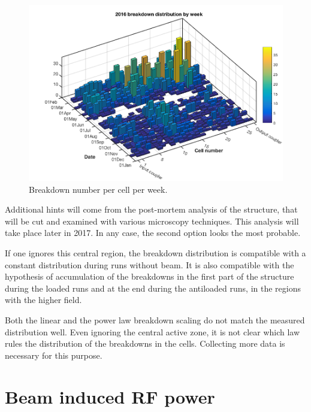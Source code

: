 \begin{figure}[h]
\centering 
\includegraphics[scale=0.38]{pictures/week_distr_3D.png}
\caption{Breakdown number per cell per week. }
\label{BD_3d}
\end{figure}

Additional hints will come from the post-mortem analysis of the structure, that will be cut and examined with various microscopy techniques. This analysis will take place later in 2017. In any case, the second option looks the most probable. 

If one ignores this central region, the breakdown distribution is compatible with a constant distribution during runs without beam. It is also compatible with the hypothesis of accumulation of the breakdowns in  the first part of the structure during the loaded runs and at the end during the antiloaded runs, in the regions with the higher field.

Both the linear and the power law breakdown scaling do not match the measured distribution well. Even ignoring the central active zone, it is not clear which law rules the distribution of the breakdowns in the cells. Collecting more data is necessary for this purpose.

\section[Beam induced RF power]{Beam induced RF power}

